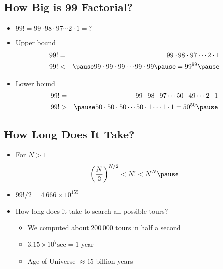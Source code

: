 
\begin{slide}
\section{How Big is 99 Factorial?}

\begin{itemize}
  \item $99!=99\cdot98\cdot97\cdots2\cdot1=?$\pause
  \item Upper bound\pause
    \begin{eqnarray*}
      99! &=& 99\cdot98\cdot97\cdots2\cdot1\\
      99! &<& \pause 99\cdot99\cdot99\cdots99\cdot99\pause = 99^{99}\pause
    \end{eqnarray*}
  \item Lower bound\pause
    \begin{eqnarray*}
      99! &=&        99\cdot98\cdot97\cdots50\cdot49\cdots2\cdot1 \\
      99! &>& \pause 50\cdot50\cdot50\cdots50\cdot1\cdots1\cdot1
      = 50^{50}\pause
    \end{eqnarray*}
\end{itemize}
\end{slide}


\begin{slide}
\section{How Long Does It Take?}
\begin{itemize}
\item For $N>1$
  \begin{displaymath}
    \left(\frac{N}{2}\right)^{N/2} < N! < N^N\pause
  \end{displaymath}
\item $99!/2 = 4.666\times10^{155}$\pause
\item How long does it take to search all possible tours?\pause
  \begin{itemize}
  \item We computed about $200\,000$ tours in half a second\pause
  \item $3.15\times10^7 \mbox{sec}=1$ year\pause
  \item Age of Universe $\approx 15$ billion years\pause
  \end{itemize}
\end{itemize}

\end{slide}

